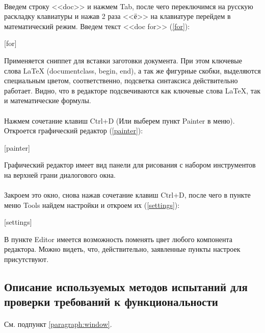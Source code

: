 \documentclass[testmethods]{espd}
\begin{document}
\paragraph{}
Введем строку <<doc>> и нажмем Tab, после чего переключимся на русскую раскладку клавиатуры и нажав 2 раза <<ё>> на клавиатуре перейдем в математический режим. Введем текст <<doc for>> (\ref{for}):

[for]

Применяется сниппет для вставки заготовки документа. При этом ключевые слова LaTeX (documentclass, begin, end), а так же фигурные скобки, выделяются специальным цветом, соответственно, подсветка синтаксиса действительно работает. Видно, что в редакторе подсвечиваются как ключевые слова LaTeX, так и математические формулы.

\paragraph{}
Нажмем сочетание клавиш Ctrl+D (Или выберем пункт Painter в меню). Откроется графический редактор (\ref{painter}):

[painter]

Графический редактор имеет вид панели для рисования с набором инструментов на верхней грани диалогового окна.

\paragraph{}\label{paragraph:settings}
Закроем это окно, снова нажав сочетание клавиш Ctrl+D, после чего в пункте меню Tools найдем настройки и откроем их (\ref{settings}):

[settings]

В пункте Editor имеется возможность поменять цвет любого компонента редактора. Можно видеть, что, действительно, заявленные пункты настроек присутствуют.

\subsection{Описание используемых методов испытаний для проверки требований к функциональности}
\paragraph{} %
См. подпункт \ref{paragraph:window}.
\end{document}
